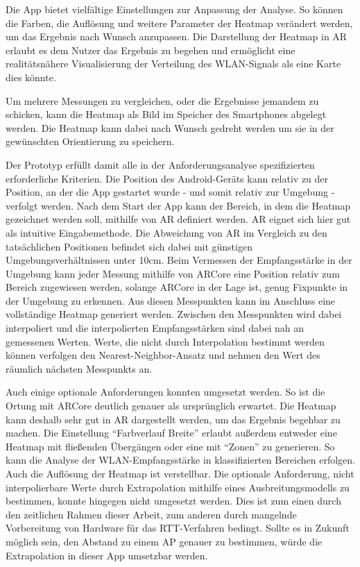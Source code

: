 \documentclass[10pt]{scrartcl}
\begin{document}
Die App bietet vielfältige Einstellungen zur Anpassung der Analyse. So können die Farben, die Auflösung und weitere Parameter der Heatmap verändert werden, um das Ergebnis nach Wunsch anzupassen. Die Darstellung der Heatmap in AR erlaubt es dem Nutzer das Ergebnis zu begehen und ermöglicht eine realitätsnähere Visualisierung der Verteilung des WLAN-Signals als eine Karte dies könnte.

Um mehrere Messungen zu vergleichen, oder die Ergebnisse jemandem zu schicken, kann die Heatmap als Bild im Speicher des Smartphones abgelegt werden. Die Heatmap kann dabei nach Wunsch gedreht werden um sie in der gewünschten Orientierung zu speichern.

Der Prototyp erfüllt damit alle in der Anforderungsanalyse spezifizierten erforderliche Kriterien. Die Position des Android-Geräts kann relativ zu der Position, an der die App gestartet wurde - und somit relativ zur Umgebung - verfolgt werden. Nach dem Start der App kann der Bereich, in dem die Heatmap gezeichnet werden soll, mithilfe von AR definiert werden. AR eignet sich hier gut als intuitive Eingabemethode. Die Abweichung von AR im Vergleich zu den tatsächlichen Positionen befindet sich dabei mit günstigen Umgebungsverhältnissen unter 10cm. Beim Vermessen der Empfangsstärke in der Umgebung kann jeder Messung mithilfe von ARCore eine Position relativ zum Bereich zugewiesen werden, solange ARCore in der Lage ist, genug Fixpunkte in der Umgebung zu erkennen. Aus diesen Messpunkten kann im Anschluss eine vollständige Heatmap generiert werden. Zwischen den Messpunkten wird dabei interpoliert und die interpolierten Empfangsstärken sind dabei nah an gemessenen Werten. Werte, die nicht durch Interpolation bestimmt werden können verfolgen den Nearest-Neighbor-Ansatz und nehmen den Wert des räumlich nächsten Messpunkts an.

Auch einige optionale Anforderungen konnten umgesetzt werden. So ist die Ortung mit ARCore deutlich genauer als ursprünglich erwartet. Die Heatmap kann deshalb sehr gut in AR dargestellt werden, um das Ergebnis begehbar zu machen. Die Einstellung \enquote{Farbverlauf Breite} erlaubt außerdem entweder eine Heatmap mit fließenden Übergängen oder eine mit \enquote{Zonen} zu generieren. So kann die Analyse der WLAN-Empfangsstärke in klassifizierten Bereichen erfolgen. Auch die Auflösung der Heatmap ist verstellbar. Die optionale Anforderung, nicht interpolierbare Werte durch Extrapolation mithilfe eines Ausbreitungsmodells zu bestimmen, konnte hingegen nicht umgesetzt werden. Dies ist zum einen durch den zeitlichen Rahmen dieser Arbeit, zum anderen durch mangelnde Vorbereitung von Hardware für das RTT-Verfahren bedingt. Sollte es in Zukunft möglich sein, den Abstand zu einem AP genauer zu bestimmen, würde die Extrapolation in dieser App umsetzbar werden.
\end{document}
